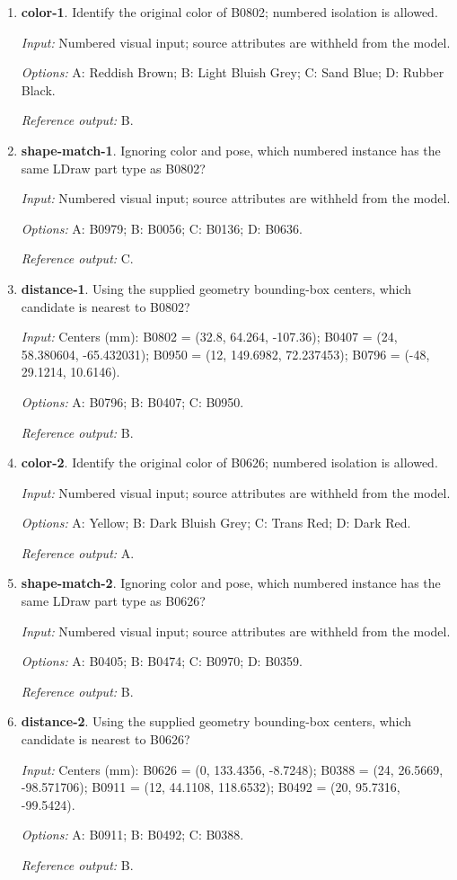 \begin{enumerate}
\item \textbf{color-1}. Identify the original color of B0802; numbered isolation is allowed.\par {\small \textit{Input:} Numbered visual input; source attributes are withheld from the model. \par\textit{Options:} A: Reddish Brown; B: Light Bluish Grey; C: Sand Blue; D: Rubber Black. \par\textit{Reference output:} B.}
\item \textbf{shape-match-1}. Ignoring color and pose, which numbered instance has the same LDraw part type as B0802?\par {\small \textit{Input:} Numbered visual input; source attributes are withheld from the model. \par\textit{Options:} A: B0979; B: B0056; C: B0136; D: B0636. \par\textit{Reference output:} C.}
\item \textbf{distance-1}. Using the supplied geometry bounding-box centers, which candidate is nearest to B0802?\par {\small \textit{Input:} Centers (mm): B0802 = (32.8, 64.264, -107.36); B0407 = (24, 58.380604, -65.432031); B0950 = (12, 149.6982, 72.237453); B0796 = (-48, 29.1214, 10.6146). \par\textit{Options:} A: B0796; B: B0407; C: B0950. \par\textit{Reference output:} B.}
\item \textbf{color-2}. Identify the original color of B0626; numbered isolation is allowed.\par {\small \textit{Input:} Numbered visual input; source attributes are withheld from the model. \par\textit{Options:} A: Yellow; B: Dark Bluish Grey; C: Trans Red; D: Dark Red. \par\textit{Reference output:} A.}
\item \textbf{shape-match-2}. Ignoring color and pose, which numbered instance has the same LDraw part type as B0626?\par {\small \textit{Input:} Numbered visual input; source attributes are withheld from the model. \par\textit{Options:} A: B0405; B: B0474; C: B0970; D: B0359. \par\textit{Reference output:} B.}
\item \textbf{distance-2}. Using the supplied geometry bounding-box centers, which candidate is nearest to B0626?\par {\small \textit{Input:} Centers (mm): B0626 = (0, 133.4356, -8.7248); B0388 = (24, 26.5669, -98.571706); B0911 = (12, 44.1108, 118.6532); B0492 = (20, 95.7316, -99.5424). \par\textit{Options:} A: B0911; B: B0492; C: B0388. \par\textit{Reference output:} B.}

\end{enumerate}
